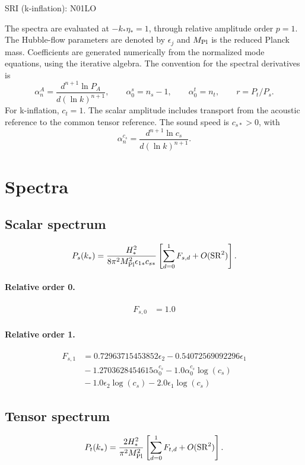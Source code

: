 \documentclass[10pt]{article}
\begin{document}
\begin{center}\Large SRI (k-inflation): N01LO\end{center}
The spectra are evaluated at $-k_*\eta_*=1$, through relative amplitude
order $p=1$. The Hubble-flow parameters are denoted by $\epsilon_j$
and $M_{\rm Pl}$ is the reduced Planck mass. Coefficients are generated
numerically from the normalized mode equations, using the iterative algebra.
The convention for the spectral derivatives is
\[
\alpha_n^A=\frac{d^{n+1}\ln P_A}{d(\ln k)^{n+1}},\qquad
\alpha_0^s=n_s-1,\qquad\alpha_0^t=n_t,\qquad r=P_t/P_s.
\]
For k-inflation, $c_t=1$. The scalar amplitude includes transport from the acoustic reference to the common tensor reference. The sound speed is $c_{s*}>0$, with
\[\alpha_n^{c_s}=\frac{d^{n+1}\ln c_s}{d(\ln k)^{n+1}}.\]
\section{Spectra}

\subsection{Scalar spectrum}
\[P_s(k_*)=\frac{H_*^2}{8\pi^2M_{\rm Pl}^2\epsilon_{1*}c_{s*}}\left[\sum_{d=0}^{1}F_{s,d}+O(\mathrm{SR}^{2})\right].\]
\paragraph{Relative order 0.}
\begin{align*}
F_{s,0} &= 1.0
\end{align*}

\paragraph{Relative order 1.}
\begin{align*}
F_{s,1} &= 0.72963715453852 \epsilon_{2} - 0.54072569092296 \epsilon_{1} \\
&{}  - 1.2703628454615 \alpha_{0}^{c_s} - 1.0 \alpha_{0}^{c_s} \log{\left(c_{s} \right)} \\
&{}  - 1.0 \epsilon_{2} \log{\left(c_{s} \right)} - 2.0 \epsilon_{1} \log{\left(c_{s} \right)}
\end{align*}

\subsection{Tensor spectrum}
\[P_t(k_*)=\frac{2H_*^2}{\pi^2M_{\rm Pl}^2}\left[\sum_{d=0}^{1}F_{t,d}+O(\mathrm{SR}^{2})\right].\]
\end{document}
